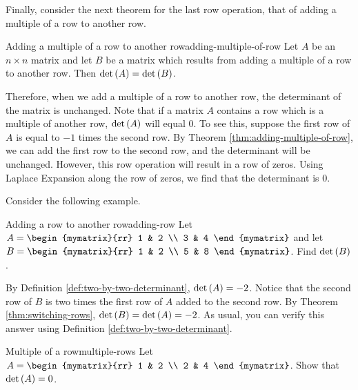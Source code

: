Finally, consider the next theorem for the last row operation, that of adding a multiple of a row
to another row. 

\begin{theorem}{Adding a multiple of a row to another row}{adding-multiple-of-row}
Let $A$ be an $n\times n$ matrix and let $B$ be a matrix
which results from adding a multiple of a row to another row.
 Then $\det \left(A\right) =\det
\left(B \right)$.
\end{theorem}

Therefore, when we add a multiple of a row to another row, the determinant of the matrix is unchanged. 
Note that if a matrix $A$ contains a row which is a multiple of another row, $\det \left(A\right)$ will equal $0$. To see this,
suppose the first row of $A$ is equal to $-1$ times the second row. By Theorem \ref{thm:adding-multiple-of-row}, we can 
add the first row to the second row, and the determinant will be unchanged. However, this row operation will result in a row of zeros.
Using Laplace Expansion along the row of zeros, we find that the determinant is $0$. 

Consider the following example.

\begin{example}{Adding a row to another row}{adding-row}
Let $A=\begin{mymatrix}{rr}
1 & 2 \\
3 & 4
\end{mymatrix} $ and let $B=\begin{mymatrix}{rr}
1 & 2 \\
5 & 8
\end{mymatrix}$. 
Find $\det \left(B\right)$.
\end{example}

\begin{solution}
By Definition \ref{def:two-by-two-determinant}, $\det \left(A\right) = -2$. 
Notice that the second row of $B$ is two times the first row of $A$ added
to the second row. 
By Theorem \ref{thm:switching-rows}, $\det \left(B\right) = \det \left(A \right)
=-2$.
As usual, you can verify this answer using Definition \ref{def:two-by-two-determinant}.
\end{solution}

\begin{example}{Multiple of a row}{multiple-rows}
Let $A = \begin{mymatrix}{rr}
1 & 2 \\
2 & 4 
\end{mymatrix}$. Show that $\det \left(A \right) = 0$. 
\end{example}

